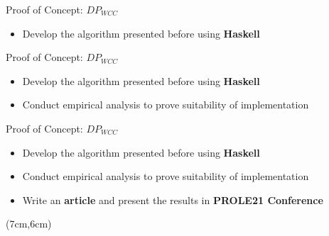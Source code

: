 \begin{frame}[fragile]{Proof of Concept: $DP_{WCC}$}
  \begin{itemize}
    \item Develop the algorithm presented before using \textbf{Haskell}
  \end{itemize}
\end{frame}

\begin{frame}[fragile]{Proof of Concept: $DP_{WCC}$}
  \begin{itemize}
    \setlength\itemsep{2em}
    \item {\color{light}Develop the algorithm presented before using \textbf{Haskell}}
    \item Conduct empirical analysis to prove suitability of implementation
  \end{itemize}
\end{frame}

\begin{frame}[fragile]{Proof of Concept: $DP_{WCC}$}
  \begin{itemize}
    \setlength\itemsep{2em}
    \item {\color{light}Develop the algorithm presented before using \textbf{Haskell}}
    \item {\color{light}Conduct empirical analysis to prove suitability of implementation}
    \item Write an \textbf{article} and present the results in \textbf{PROLE21 Conference}~\cite{prole:2021:017}
  \end{itemize}
  \begin{textblock*}{7cm}(7cm,6cm) %
  \end{textblock*}
\end{frame}

